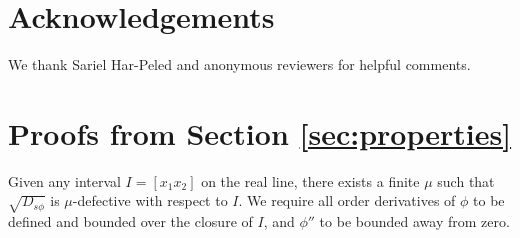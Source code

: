 \documentclass[11pt]{myclass}
\newcommand{\sbreg}{\ensuremath{D_{s\phi}}}
\begin{document}
\section{Acknowledgements}
We thank Sariel Har-Peled and anonymous reviewers for helpful comments.


\appendix
\section{Proofs from Section \ref{sec:properties}}
\label{sec:bounded}
\begin{lemma}\label{app:1}
Given any interval $I=[x_1 x_2]$ on the real line, there exists a finite $\mu$ such that  $\sqrt{\sbreg}$ is $\mu$-defective with respect to $I$. We require all order derivatives of $\phi$ to be defined and bounded over the closure of $I$,
and $\phi''$ to be bounded away from zero.
\end{lemma}
\end{document}
